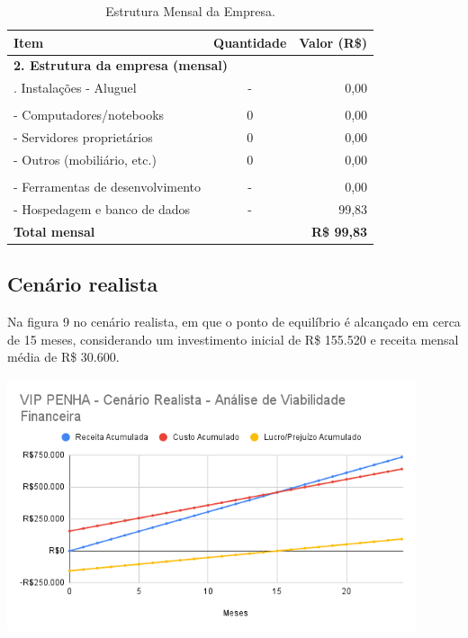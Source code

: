 \documentclass[
	12pt,				%
	openany,			%
	twoside,			%
	a4paper,			%
	english,			%
	brazil				%
	]{abntex2}
\begin{document}
\begin{table}[hbtp]
\centering
\caption{Estrutura Mensal da Empresa.}
\label{tab:estrutura_mensal}
\begin{tabular}{lcr}
\toprule
\textbf{Item} & \textbf{Quantidade} & \textbf{Valor (R\$)} \\
\midrule
\multicolumn{3}{l}{\textbf{2. Estrutura da empresa (mensal)}} \\
\addlinespace %
\quad 2.1. Instalações - Aluguel & - & 0,00 \\
\addlinespace
\multicolumn{3}{l}{\quad 2.2. Equipamentos (TI e Outros)} \\
\qquad - Computadores/notebooks & 0 & 0,00 \\
\qquad - Servidores proprietários & 0 & 0,00 \\
\qquad - Outros (mobiliário, etc.) & 0 & 0,00 \\
\addlinespace
\multicolumn{3}{l}{\quad 2.3. Serviços de TI} \\
\qquad - Ferramentas de desenvolvimento & - & 0,00 \\
\qquad - Hospedagem e banco de dados & - &99,83 \\
\midrule
\textbf{Total mensal} & & \textbf{R\$ 99,83} \\
\bottomrule
\end{tabular}
\end{table}


\subsection{Cenário realista}
Na figura 9 no cenário realista, em que o ponto de equilíbrio é alcançado em cerca de 15 meses, considerando um investimento inicial de R\$ 155.520 e receita mensal média de R\$ 30.600.
\begin{center}
  \includegraphics[width=0.9\textwidth]{Figuras/CenarioRealista.png}
\end{center}
\end{document}
